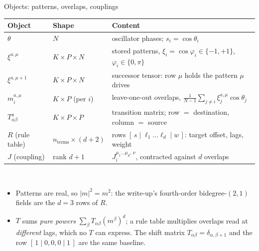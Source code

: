 \documentclass[aspectratio=169]{beamer}
\newcommand{\xxi}{\xi}
\newcommand{\thetavar}{\theta}
\newcommand{\mvar}{m}
\begin{document}
\begin{frame}{Objects: patterns, overlaps, couplings}
  \centering
  \small
  \begin{tabular}{lll}
    \toprule
    Object & Shape & Content \\
    \midrule
    $\thetavar$            & $N$         & oscillator phases; $s_i = \cos\thetavar_i$ \\
    $\xxi^{a,\mu}$         & $K \times P \times N$ & stored patterns,
      $\xxi_i = \cos\varphi_i \in \{-1,+1\}$, $\varphi_i \in \{0,\pi\}$ \\
    $\xxi^{a,\mu+1}$       & $K \times P \times N$ & successor tensor: row $\mu$ holds
      the pattern $\mu$ drives \\
    $\mvar_i^{a,\mu}$      & $K \times P$ (per $i$) & leave-one-out overlaps,
      $\frac{1}{N-1}\sum_{j \ne i}\xxi_j^{a,\mu}\cos\thetavar_j$ \\
    $T^a_{\alpha\beta}$    & $K \times P \times P$ & transition matrix; row $=$
      destination, column $=$ source \\
    $R$ (rule table)       & $n_{\text{terms}} \times (d+2)$ &
      rows $[\,s \mid \ell_1 \dots \ell_d \mid w\,]$: target offset, lags, weight \\
    $J$ (coupling)         & rank $d+1$  & $J_i^{\mu_1 \dots \mu_d,\,\nu}$, contracted
      against $d$ overlaps \\
    \bottomrule
  \end{tabular}
  \\[3mm]
  \begin{itemize}
    \item Patterns are real, so $|\mvar|^2 = \mvar^2$: the write-up's fourth-order
      bidegree-$(2,1)$ fields are the $d = 3$ rows of $R$.
    \item $T$ sums \emph{pure powers} $\sum_\beta T_{\alpha\beta}(\mvar^\beta)^d$;
      a rule table multiplies overlaps read at \emph{different} lags, which no $T$ can
      express. The shift matrix $T_{\alpha\beta} = \delta_{\alpha,\beta+1}$ and the row
      $[\,1 \mid 0,0,0 \mid 1\,]$ are the same baseline.
  \end{itemize}
\end{frame}
\end{document}
